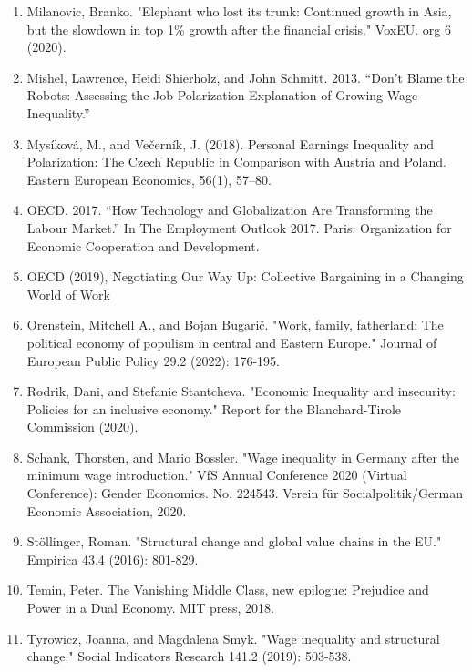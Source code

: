 \documentclass{article}
\begin{document}
\begin{enumerate}
\item Milanovic, Branko. "Elephant who lost its trunk: Continued growth in Asia, but the slowdown in top 1\% growth after the financial crisis." VoxEU. org 6 (2020).

\item Mishel, Lawrence, Heidi Shierholz, and John Schmitt. 2013. “Don’t Blame the Robots: Assessing the Job Polarization Explanation of Growing Wage Inequality.”

\item Mysíková, M., and Večerník, J. (2018). Personal Earnings Inequality and Polarization: The Czech Republic in Comparison with Austria and Poland. Eastern European Economics, 56(1), 57–80.

\item OECD. 2017. “How Technology and Globalization Are Transforming the Labour Market.” In The Employment Outlook 2017. Paris: Organization for Economic Cooperation and Development.

\item OECD (2019), Negotiating Our Way Up: Collective Bargaining in a Changing World of Work

\item Orenstein, Mitchell A., and Bojan Bugarič. "Work, family, fatherland: The political economy of populism in central and Eastern Europe." Journal of European Public Policy 29.2 (2022): 176-195.

\item Rodrik, Dani, and Stefanie Stantcheva. "Economic Inequality and insecurity: Policies for an inclusive economy." Report for the Blanchard-Tirole Commission (2020).

\item Schank, Thorsten, and Mario Bossler. "Wage inequality in Germany after the minimum wage introduction." VfS Annual Conference 2020 (Virtual Conference): Gender Economics. No. 224543. Verein für Socialpolitik/German Economic Association, 2020.

\item Stöllinger, Roman. "Structural change and global value chains in the EU." Empirica 43.4 (2016): 801-829.

\item Temin, Peter. The Vanishing Middle Class, new epilogue: Prejudice and Power in a Dual Economy. MIT press, 2018.

\item Tyrowicz, Joanna, and Magdalena Smyk. "Wage inequality and structural change." Social Indicators Research 141.2 (2019): 503-538.













\end{enumerate}
\end{document}
